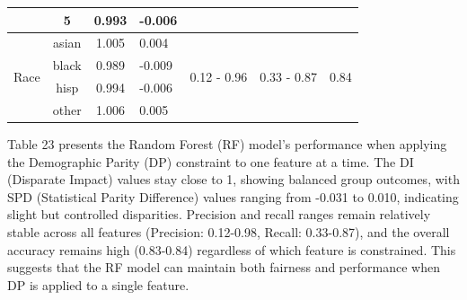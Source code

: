 \documentclass{article}
\begin{document}
\begin{table}[H]
\begin{tabular}{lccc|ccc}
                               & 5     & 0.993                  & -0.006                     &                                                  &                                                  &                                           \\
\hline
\multirow{4}{*}{Race}          & asian & 1.005                  & \multicolumn{1}{l|}{0.004}  & \multicolumn{1}{c}{\multirow{4}{*}{0.12 - 0.96}} & \multicolumn{1}{c}{\multirow{4}{*}{0.33 - 0.87}} & \multicolumn{1}{c}{\multirow{4}{*}{0.84}} \\
                               & black & 0.989                  & \multicolumn{1}{l|}{-0.009} & \multicolumn{1}{l}{}                             & \multicolumn{1}{l}{}                             & \multicolumn{1}{l}{}                      \\
                               & hisp  & 0.994                  & \multicolumn{1}{l|}{-0.006} & \multicolumn{1}{l}{}                             & \multicolumn{1}{l}{}                             & \multicolumn{1}{l}{}                      \\
                               & other & 1.006                  & \multicolumn{1}{l|}{0.005}  & \multicolumn{1}{l}{}                             & \multicolumn{1}{l}{}                             & \multicolumn{1}{l}{}                     
\end{tabular}
\end{table}
Table 23 presents the Random Forest (RF) model’s performance when applying the Demographic Parity (DP) constraint to one feature at a time. The DI (Disparate Impact) values stay close to 1, showing balanced group outcomes, with SPD (Statistical Parity Difference) values ranging from -0.031 to 0.010, indicating slight but controlled disparities. Precision and recall ranges remain relatively stable across all features (Precision: 0.12-0.98, Recall: 0.33-0.87), and the overall accuracy remains high (0.83-0.84) regardless of which feature is constrained. This suggests that the RF model can maintain both fairness and performance when DP is applied to a single feature.
\end{document}
